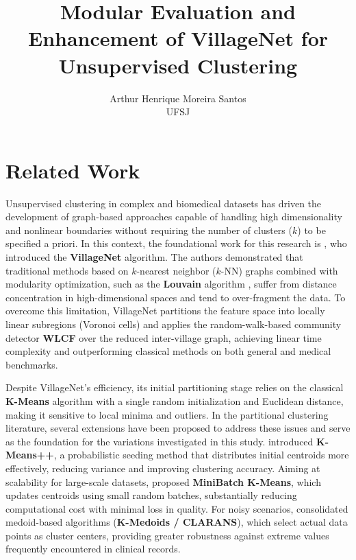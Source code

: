 \documentclass[12pt, a4paper]{article}
\title{\textbf{Modular Evaluation and Enhancement of VillageNet for Unsupervised Clustering}}
\author{Arthur Henrique Moreira Santos \\ \small UFSJ}
\date{}
\begin{document}
\maketitle

\section{Related Work}

Unsupervised clustering in complex and biomedical datasets has driven the development of graph-based approaches capable of handling high dimensionality and nonlinear 
boundaries without requiring the number of clusters ($k$) to be specified a priori. In this context, the foundational work for this research is \citet{ballal2026villagenet}, 
who introduced the \textbf{VillageNet} algorithm. The authors demonstrated that traditional methods based on $k$-nearest neighbor ($k$-NN) graphs combined with modularity 
optimization, such as the \textbf{Louvain} algorithm \citep{blondel2008louvain}, suffer from distance concentration in high-dimensional spaces and tend to over-fragment 
the data. To overcome this limitation, VillageNet partitions the feature space into locally linear subregions (Voronoi cells) and applies the random-walk-based community 
detector \textbf{WLCF} \citep{ballal2022wlcf} over the reduced inter-village graph, achieving linear time complexity and outperforming classical methods on both general 
and medical benchmarks.

Despite VillageNet's efficiency, its initial partitioning stage relies on the classical \textbf{K-Means} algorithm \citep{macqueen1967some} with a single random 
initialization and Euclidean distance, making it sensitive to local minima and outliers. In the partitional clustering literature, several extensions have been 
proposed to address these issues and serve as the foundation for the variations investigated in this study. \citet{arthur2007kmeanspp} introduced \textbf{K-Means++}, a
 probabilistic seeding method that distributes initial centroids more effectively, reducing variance and improving clustering accuracy. Aiming at scalability for 
 large-scale datasets, \citet{sculley2010minibatch} proposed \textbf{MiniBatch K-Means}, which updates centroids using small random batches, substantially reducing 
 computational cost with minimal loss in quality. For noisy scenarios, \citet{ng2002clarans} consolidated medoid-based algorithms (\textbf{K-Medoids / CLARANS}), which 
 select actual data points as cluster centers, providing greater robustness against extreme values frequently encountered in clinical records.
\end{document}
